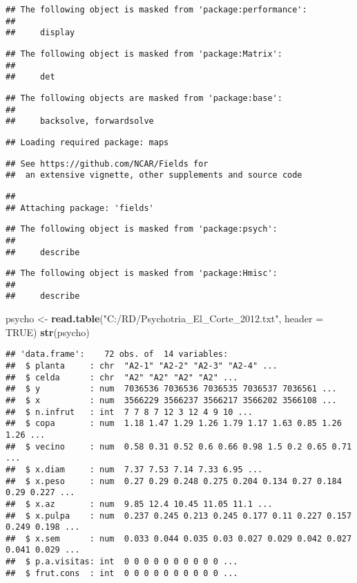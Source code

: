 \documentclass[
]{book}
\newenvironment{Shaded}{\begin{snugshade}}{\end{snugshade}}
\newcommand{\DataTypeTok}[1]{\textcolor[rgb]{0.13,0.29,0.53}{#1}}
\newcommand{\KeywordTok}[1]{\textcolor[rgb]{0.13,0.29,0.53}{\textbf{#1}}}
\newcommand{\NormalTok}[1]{#1}
\newcommand{\OtherTok}[1]{\textcolor[rgb]{0.56,0.35,0.01}{#1}}
\newcommand{\StringTok}[1]{\textcolor[rgb]{0.31,0.60,0.02}{#1}}
\begin{document}
\begin{verbatim}
## The following object is masked from 'package:performance':
## 
##     display
\end{verbatim}

\begin{verbatim}
## The following object is masked from 'package:Matrix':
## 
##     det
\end{verbatim}

\begin{verbatim}
## The following objects are masked from 'package:base':
## 
##     backsolve, forwardsolve
\end{verbatim}

\begin{verbatim}
## Loading required package: maps
\end{verbatim}

\begin{verbatim}
## See https://github.com/NCAR/Fields for
##  an extensive vignette, other supplements and source code
\end{verbatim}

\begin{verbatim}
## 
## Attaching package: 'fields'
\end{verbatim}

\begin{verbatim}
## The following object is masked from 'package:psych':
## 
##     describe
\end{verbatim}

\begin{verbatim}
## The following object is masked from 'package:Hmisc':
## 
##     describe
\end{verbatim}

\begin{Shaded}
\begin{Highlighting}[]
\NormalTok{psycho <-}\StringTok{ }\KeywordTok{read.table}\NormalTok{(}\StringTok{"C:/RD/Psychotria_El_Corte_2012.txt"}\NormalTok{, }\DataTypeTok{header =} \OtherTok{TRUE}\NormalTok{)}
\KeywordTok{str}\NormalTok{(psycho)}
\end{Highlighting}
\end{Shaded}

\begin{verbatim}
## 'data.frame':    72 obs. of  14 variables:
##  $ planta     : chr  "A2-1" "A2-2" "A2-3" "A2-4" ...
##  $ celda      : chr  "A2" "A2" "A2" "A2" ...
##  $ y          : num  7036536 7036536 7036535 7036537 7036561 ...
##  $ x          : num  3566229 3566237 3566217 3566202 3566108 ...
##  $ n.infrut   : int  7 7 8 7 12 3 12 4 9 10 ...
##  $ copa       : num  1.18 1.47 1.29 1.26 1.79 1.17 1.63 0.85 1.26 1.26 ...
##  $ vecino     : num  0.58 0.31 0.52 0.6 0.66 0.98 1.5 0.2 0.65 0.71 ...
##  $ x.diam     : num  7.37 7.53 7.14 7.33 6.95 ...
##  $ x.peso     : num  0.27 0.29 0.248 0.275 0.204 0.134 0.27 0.184 0.29 0.227 ...
##  $ x.az       : num  9.85 12.4 10.45 11.05 11.1 ...
##  $ x.pulpa    : num  0.237 0.245 0.213 0.245 0.177 0.11 0.227 0.157 0.249 0.198 ...
##  $ x.sem      : num  0.033 0.044 0.035 0.03 0.027 0.029 0.042 0.027 0.041 0.029 ...
##  $ p.a.visitas: int  0 0 0 0 0 0 0 0 0 0 ...
##  $ frut.cons  : int  0 0 0 0 0 0 0 0 0 0 ...
\end{verbatim}
\end{document}

